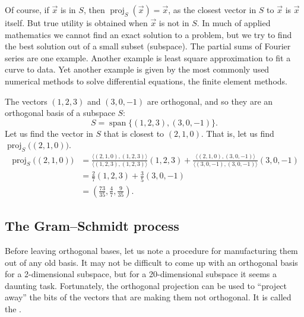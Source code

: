 \documentclass{ximera}
\begin{document}
Of course, if $\vec{x}$ is in $S$, then $\operatorname{proj}_{S}(\vec{x}) = \vec{x}$, as the closest vector in $S$ to $\vec{x}$ is $\vec{x}$ itself. But true utility is obtained when $\vec{x}$ is not in $S$. In much of applied mathematics we cannot find an exact solution to a problem, but we try to find the best solution out of a small subset (subspace).  The partial sums of Fourier series %
are one example.  Another example is least square approximation to fit a curve to data.  Yet another example is given by the most commonly used numerical methods to solve differential equations, the finite element methods.

\begin{example}
    The vectors $(1,2,3)$ and $(3,0,-1)$ are orthogonal, and so they are an orthogonal basis of a subspace $S$:
    \begin{equation*}
        S = \operatorname{span} \bigl\{ (1,2,3), (3,0,-1) \bigr\} .
    \end{equation*}
    Let us find the vector in $S$ that is closest to $(2,1,0)$.  That is, let us find $\operatorname{proj}_{S}\bigl((2,1,0)\bigr)$.
    \begin{equation*}
        \begin{split}
            \operatorname{proj}_{S}\bigl((2,1,0)\bigr) 
            & = \frac{\langle (2,1,0), (1,2,3) \rangle}{ \langle (1,2,3), (1,2,3) \rangle } (1,2,3) + \frac{\langle (2,1,0), (3,0,-1) \rangle}{ \langle (3,0,-1), (3,0,-1) \rangle } (3,0,-1) \\
            & = \frac{2}{7} (1,2,3) + \frac{3}{5} (3,0,-1) \\
            &= \left( \frac{73}{35} , \frac{4}{7} , \frac{9}{35} \right) .
        \end{split}
    \end{equation*}
\end{example}

\subsection{The Gram--Schmidt process}

Before leaving orthogonal bases, let us note a procedure for manufacturing them out of any old basis.  It may not be difficult to come up with an orthogonal basis for a 2-dimensional subspace, but for a 20-dimensional subspace it seems a daunting task.  Fortunately, the orthogonal projection can be used to ``project away'' the bits of the vectors that are making them not orthogonal.  It is called the \emph{}.
\end{document}
